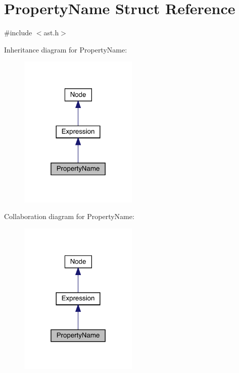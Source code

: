 \hypertarget{struct_property_name}{}\section{Property\+Name Struct Reference}
\label{struct_property_name}


{\ttfamily \#include $<$ast.\+h$>$}



Inheritance diagram for Property\+Name\+:\nopagebreak
\begin{figure}[H]
\begin{center}
\leavevmode
\includegraphics[width=160pt]{struct_property_name__inherit__graph}
\end{center}
\end{figure}


Collaboration diagram for Property\+Name\+:\nopagebreak
\begin{figure}[H]
\begin{center}
\leavevmode
\includegraphics[width=160pt]{struct_property_name__coll__graph}
\end{center}
\end{figure}
